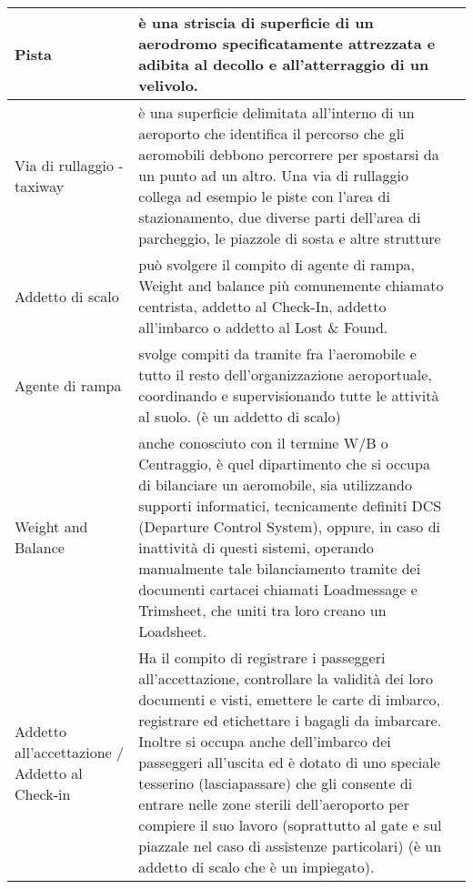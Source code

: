 \begin{table}[htp]
{\begin{tabular}{p{}|p{}|p{}}
		\hline
		\textsf{\small Pista} & \textsf{\small è una striscia di superficie di un aerodromo specificatamente attrezzata e adibita al decollo e all'atterraggio di un velivolo.} & \textsf{\small } \\
		\hline
		\textsf{\small Via di rullaggio - taxiway} & \textsf{\small è una superficie delimitata all'interno di un aeroporto che identifica il percorso che gli aeromobili debbono percorrere per spostarsi da un punto ad un altro. Una via di rullaggio collega ad esempio le piste con l'area di stazionamento, due diverse parti dell'area di parcheggio, le piazzole di sosta e altre strutture} & \textsf{\small } \\
		\hline
		\textsf{\small Addetto di scalo} & \textsf{\small può svolgere il compito di agente di rampa, Weight and balance più comunemente chiamato centrista, addetto al Check-In, addetto all'imbarco o addetto al Lost \& Found.} & \textsf{\small } \\
		\hline
		\textsf{\small Agente di rampa} & \textsf{\small  svolge compiti da tramite fra l'aeromobile e tutto il resto dell'organizzazione aeroportuale, coordinando e supervisionando tutte le attività al suolo. (è un addetto di scalo)} & \textsf{\small } \\
		\hline
		\textsf{\small Weight and Balance} & \textsf{\small  anche conosciuto con il termine W/B o Centraggio, è quel dipartimento che si occupa di bilanciare un aeromobile, sia utilizzando supporti informatici, tecnicamente definiti DCS (Departure Control System), oppure, in caso di inattività di questi sistemi, operando manualmente tale bilanciamento tramite dei documenti cartacei chiamati Loadmessage e Trimsheet, che uniti tra loro creano un Loadsheet.} & \textsf{\small } \\
		\hline
		\textsf{\small Addetto all'accettazione / Addetto al Check-in} & \textsf{\small Ha il compito di registrare i passeggeri all'accettazione, controllare la validità dei loro documenti e visti, emettere le carte di imbarco, registrare ed etichettare i bagagli da imbarcare. Inoltre si occupa anche dell'imbarco dei passeggeri all'uscita ed è dotato di uno speciale tesserino (lasciapassare) che gli consente di entrare nelle zone sterili dell'aeroporto per compiere il suo lavoro (soprattutto al gate e sul piazzale nel caso di assistenze particolari) (è un addetto di scalo che è un impiegato).} & \textsf{\small } \\
		\end{tabular}%
	}%
\end{table}

